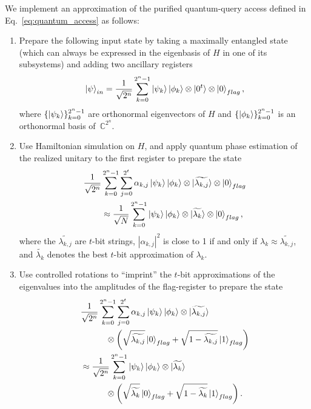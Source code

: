 \documentclass[a4paper, onecolumn, accepted=2022-08-28]{quantumarticle}
\begin{document}
We implement an approximation of the purified quantum-query access defined in Eq.~\eqref{eq:quantum_access} as follows:
\begin{enumerate}
\item Prepare the following input state by taking a maximally entangled state (which can always be expressed in the eigenbasis of $H$ in one of its subsystems) and adding two ancillary registers
  \begin{align*}
    \ket{\psi}_{in} = \frac{1}{\sqrt{2^n}} \sum_{k = 0}^{2^n-1}\ket{\psi_k}\ket{\phi_k} \otimes \ket{0^t} \otimes \ket{0}_{flag},
  \end{align*}
  where $\{\ket{\psi_k}\}_{k=0}^{2^n-1}$ are orthonormal eigenvectors of $H$ and $\{\ket{\phi_k}\}_{k=0}^{2^n-1}$ is an orthonormal basis of~$\mathbb{C}^{2^n}$.
\item Use Hamiltonian simulation on $H$, and apply quantum phase estimation of the realized unitary to the first register to prepare the state
  \begin{align*}
    \frac{1}{\sqrt{2^n}}&\sum_{k = 0}^{2^n-1}\sum_{j = 0}^{2^t}\alpha_{k,j}\ket{\psi_k}\ket{\phi_k}\otimes \ket{\widetilde{\lambda_{k,j}}} \otimes \ket{0}_{flag} \\
    &\approx \frac{1}{\sqrt{N}}\sum_{k = 0}^{2^n-1}\ket{\psi_k}\ket{\phi_k}\otimes \ket{\widetilde{\lambda_{k}}} \otimes \ket{0}_{flag},
  \end{align*}
  where the $\widetilde{\lambda_{k,j}}$ are $t$-bit strings, $|\alpha_{k,j}|^2$ is close to 1 if and only if $\lambda_k \approx \widetilde{\lambda_{k,j}}$, and $\widetilde{\lambda_k}$ denotes the best $t$-bit approximation of $\lambda_k$.
\item Use controlled rotations to ``imprint'' the $t$-bit approximations of the eigenvalues into the amplitudes of the flag-register to prepare the state
  \begin{align*}
    &\frac{1}{\sqrt{2^n}}\sum_{k = 0}^{2^n-1}\sum_{j = 0}^{2^t}\alpha_{k,j}\ket{\psi_k}\ket{\phi_k}\otimes \ket{\widetilde{\lambda_{k,j}}} \\
   &\quad\quad\quad \otimes \left(\sqrt{\widetilde{\lambda_{k,j}}}\ket{0}_{flag} + \sqrt{1 - \widetilde{\lambda_{k,j}}}\ket{1}_{flag}\right) \\
    &\approx \frac{1}{\sqrt{2^n}}\sum_{k = 0}^{2^n-1}\ket{\psi_k}\ket{\phi_k}\otimes \ket{\widetilde{\lambda_{k}}} \\
    &\quad\quad\quad\otimes \left(\sqrt{\widetilde{\lambda_{k}}}\ket{0}_{flag} + \sqrt{1 - \widetilde{\lambda_{k}}}\ket{1}_{flag}\right).

\end{align*}
\end{enumerate}
\end{document}
